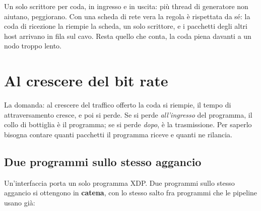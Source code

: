 \documentclass[11pt,a4paper,oneside]{report}
\begin{document}
\begin{lezione}
Un solo scrittore per coda, in ingresso e in uscita: più thread di generatore
non aiutano, peggiorano. Con una scheda di rete vera la regola è rispettata da
sé: la coda di ricezione la riempie la scheda, un solo scrittore, e i pacchetti
degli altri host arrivano in fila sul cavo. Resta quello che conta, la coda
piena davanti a un nodo troppo lento.
\end{lezione}

\section{Al crescere del bit rate}
\label{sec:bitrate}

La domanda: al crescere del traffico offerto la coda si riempie, il
tempo di attraversamento cresce, e poi si perde. Se si perde \emph{all'ingresso}
del programma, il collo di bottiglia è il programma; se si perde \emph{dopo}, è
la trasmissione. Per saperlo bisogna contare quanti pacchetti il programma
riceve e quanti ne rilancia.

\subsection*{Due programmi sullo stesso aggancio}

Un'interfaccia porta un solo programma XDP. Due programmi sullo stesso aggancio
si ottengono in \textbf{catena}, con lo stesso salto fra programmi che le
pipeline usano già:

\begin{center}
\end{center}
\end{document}
